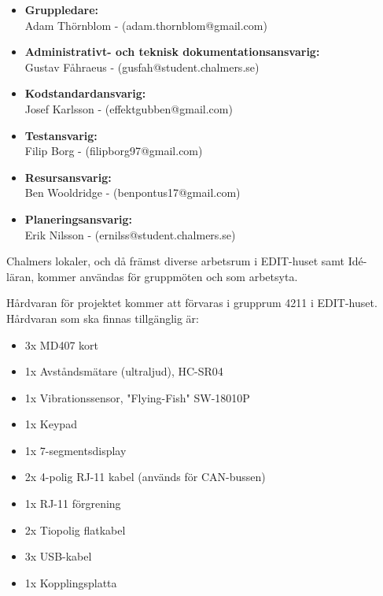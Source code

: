 \documentclass[a4paper]{article}
\begin{document}
\begin{itemize}
    \item \textbf{Gruppledare:}
    \\
    Adam Thörnblom - (adam.thornblom@gmail.com)
    
    \item \textbf{Administrativt- och teknisk dokumentationsansvarig:} 
    \\
    Gustav Fåhraeus - (gusfah@student.chalmers.se)

    \item \textbf{Kodstandardansvarig:}
    \\
    Josef Karlsson - (effektgubben@gmail.com)

    \item \textbf{Testansvarig:}
    \\
    Filip Borg - (filipborg97@gmail.com) 

    \item \textbf{Resursansvarig:} 
    \\
    Ben Wooldridge - (benpontus17@gmail.com)

    \item \textbf{Planeringsansvarig:}
    \\
    Erik Nilsson - (ernilss@student.chalmers.se) 
\end{itemize}

Chalmers lokaler, och då främst diverse arbetsrum i EDIT-huset samt Idé-\\läran, kommer användas för gruppmöten och som arbetsyta.

Hårdvaran för projektet kommer att förvaras i grupprum 4211 i EDIT-huset. Hårdvaran som ska finnas tillgänglig är:
\begin{itemize}
    \item 3x MD407 kort 
    \item 1x Avståndsmätare (ultraljud), HC-SR04 
    \item 1x Vibrationssensor, "Flying-Fish" SW-18010P 
    \item 1x Keypad 
    \item 1x 7-segmentsdisplay 
    \item 2x 4-polig RJ-11 kabel (används för CAN-bussen) 
    \item 1x RJ-11 förgrening
    \item 2x Tiopolig flatkabel 
    \item 3x USB-kabel 
    \item 1x Kopplingsplatta
\end{itemize}
\end{document}
